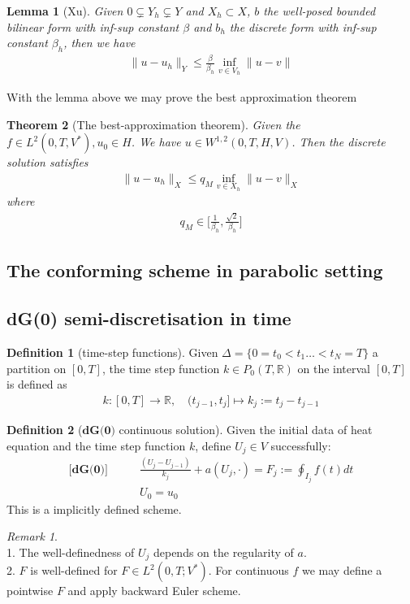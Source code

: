 \documentclass[a4paper,12pt,oneside,fleqn]{book}
\newtheorem{theorem}{Theorem}[section]
\newtheorem{lemma}[theorem]{Lemma}
\theoremstyle{definition}
\newtheorem{definition}{Definition}[section]
\theoremstyle{remark}
\newtheorem*{remark}{Remark}
\begin{document}
\begin{lemma}[Xu]
	Given $0 \subsetneq Y_h \subsetneq Y$ and $X_h \subset X$, $b$ the well-posed bounded bilinear form with inf-sup constant $\beta$ and $b_h$ the discrete form with inf-sup constant $\beta_h$, then we have
	\begin{align*}
		\|u - u_h\|_Y \le \frac{\beta}{\beta_h} \inf_{v \in V_h}\|u - v\|
	\end{align*} 
\end{lemma}

With the lemma above we may prove the best approximation theorem
\begin{theorem}[The best-approximation theorem]
	Given the $f \in L^2(0, T, V^*), u_0 \in H$. We have $u \in W^{1, 2}(0, T, H, V)$. Then the discrete solution satisfies
	\begin{align*}
		\|u - u_h\|_X \le q_M \inf_{v \in X_h} \|u - v\|_X
	\end{align*}
	where
	\begin{align*}
		q_M \in \bigg[\frac{1}{\beta_h}, \frac{\sqrt{2}}{\beta_h}\bigg]
	\end{align*}
\end{theorem}

\subsection{The conforming scheme in parabolic setting}



\subsection{dG(0) semi-discretisation in time}
\begin{definition}[time-step functions]
	Given $\Delta = \{ 0 = t_0 < t_1 \dots < t_N = T\}$ a partition on $[0, T]$, the time step function $k \in P_0(T, \mathbb{R})$ on the interval $[0, T]$ is defined as 
	\begin{align*}
		k:[0, T] \rightarrow \mathbb{R}, \quad (t_{j -1}, t_j] \mapsto k_j := t_j - t_{j -1}
	\end{align*}
\end{definition}

\begin{definition}[$\textbf{dG(0)}$ continuous solution]
	Given the initial data of heat equation and the time step function $k$, define $U_j \in V $ successfully:
	\begin{align*} \textbf{[dG(0)]} \qquad
		&\frac{(U_j - U_{j - 1})}{k_j}+ a(U_j, \cdot) = F_j:= \oint_{I_j} f(t)dt\\
		&U_0 = u_0
	\end{align*}
	This is a implicitly defined scheme.
\end{definition}
\begin{remark}
\quad\\
1. The well-definedness of $U_j$ depends on the regularity of $a$. \\
2. $F$ is well-defined for $F \in L^2(0, T; V^*)$. For continuous $f$ we may define a pointwise $F$ and apply backward Euler scheme.	
\end{remark}
\end{document}
